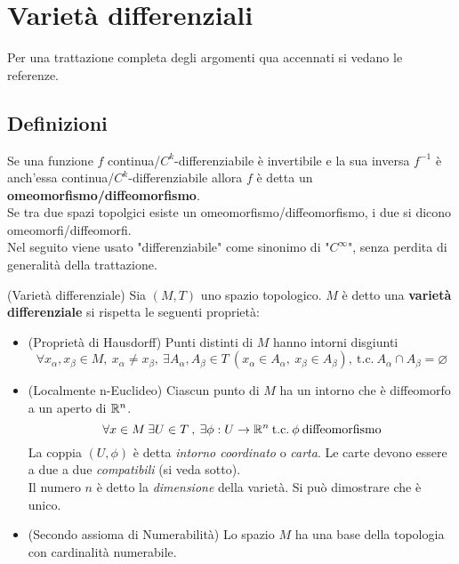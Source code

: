 \section{Varietà differenziali}
Per una trattazione completa degli argomenti qua accennati si vedano le referenze.
\subsection{Definizioni}
Se una funzione $f$ continua/$C^k$-differenziabile è invertibile e la sua inversa $f^{-1}$
è anch'essa continua/$C^k$-differenziabile allora
$f$ è detta un \textbf{omeomorfismo/diffeomorfismo}.\\
Se tra due spazi topolgici esiste un omeomorfismo/diffeomorfismo, i due si dicono
omeomorfi/diffeomorfi.\\
Nel seguito viene usato "differenziabile" come sinonimo di "$C^\infty$", senza
perdita di generalità della trattazione.

\begin{definition}{(Varietà differenziale)}
\label{def:var_differenziale}
   Sia $(M ,T)$ uno spazio topologico. $M$ è detto una \textbf{varietà
   differenziale} si rispetta le seguenti proprietà:
  \begin{itemize}
     \item (Proprietà di Hausdorff) Punti distinti di $M$ hanno intorni disgiunti
     $$\forall x_\alpha,x_\beta \in M, \: x_\alpha \neq x_\beta , \:
       \exists A_\alpha , A_\beta \in T \: (x_\alpha \in A_\alpha , \:
       x_\beta \in A_\beta),
       \: \mathrm{t.c.} \: A_\alpha \cap A_\beta = \varnothing $$

     \item (Localmente n-Euclideo) Ciascun punto di $M$ ha un intorno che è
     diffeomorfo a un aperto di $\mathbb{R}^n$.
     $$
       \forall x \in M \: \exists U \in T \:,\: \exists\phi : U \to \mathbb{R}^n
          \mathrm{\: t.c.\:} \phi \mathrm{\: diffeomorfismo}
     $$
     La coppia $(U,\phi)$ è detta \emph{intorno coordinato} o \emph{carta}.
     Le carte devono essere a due a due \emph{compatibili} (si veda sotto).\\
     Il numero $n$ è detto la \emph{dimensione} della varietà. Si può dimostrare che è unico.

     \item (Secondo assioma di Numerabilità) Lo spazio $M$ ha una base della topologia
     con cardinalità numerabile.
  \end{itemize}
\end{definition}

